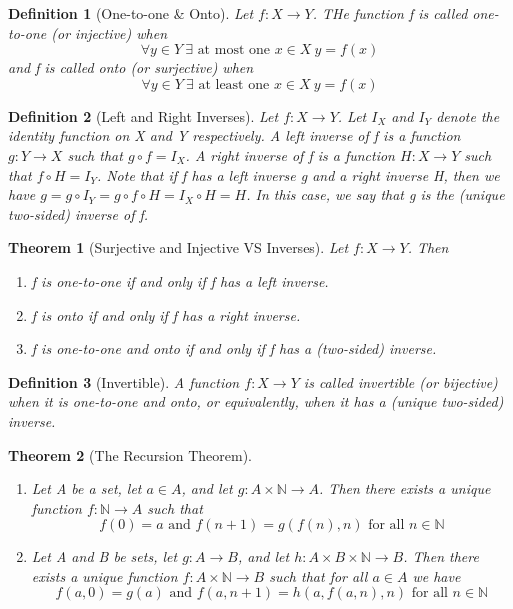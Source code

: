 \documentclass[11pt, oneside]{book}
\theoremstyle{break}
\newtheorem{thm}{Theorem}[section]
\newtheorem{defn}{Definition}[section]
\newcommand{\bb}[1]{\mathbb{#1}}			%
\begin{document}
\begin{defn}[One-to-one \& Onto]
	Let $f: X \to Y$. THe function f is called one-to-one (or injective) when
	\[
		\forall y \in Y \> \exists \text{ at most one } x \in X \> y = f(x)
	\]
	and f is called onto (or surjective) when
	\[
		\forall y \in Y \> \exists \text{ at least one } x \in X \> y = f(x)
	\]
\end{defn}

\begin{defn}[Left and Right Inverses]
	Let $f: X \to Y$. Let $I_X$ and $I_Y$ denote the identity function on X and Y respectively. A left inverse of f is a function $g: Y \to X$ such that $g \circ f = I_X$. A right inverse of f is a function $H: X \to Y$ such that $f \circ H = I_Y$. Note that if f has a left inverse g and a right inverse H, then we have $g = g \circ I_Y = g \circ f \circ H = I_X \circ H = H$. In this case, we say that g is the (unique two-sided) inverse of f.
\end{defn}

\begin{thm}[Surjective and Injective VS Inverses]
	Let $f: X \to Y$. Then
	\begin{enumerate}
		\item f is one-to-one if and only if f has a left inverse.
		\item f is onto if and only if f has a right inverse.
		\item f is one-to-one and onto if and only if f has a (two-sided) inverse.
	\end{enumerate}
\end{thm}

\begin{defn}[Invertible]
	A function $f: X \to Y$ is called invertible (or bijective) when it is one-to-one and onto, or equivalently, when it has a (unique two-sided) inverse.
\end{defn}

\begin{thm}[The Recursion Theorem]\label{recursion_theorem}
	\begin{enumerate}
		\item Let A be a set, let $a \in A$, and let $g : A \times \bb{N} \to A$. Then there exists a unique function $f: \bb{N} \to A$ such that
		\[
			f(0) = a \text{ and } f(n+1) = g(f(n), n) \text{ for all } n \in \bb{N}
		\]
		\item Let A and B be sets, let $g: A \to B$, and let $h: A \times B \times \bb{N} \to B$. Then there exists a unique function $f:A \times \bb{N} \to B$ such that for all $a \in A$ we have
		\[
			f(a, 0) = g(a) \text{ and } f(a, n + 1) = h(a, f(a, n), n) \text{ for all } n \in \bb{N}
		\]
	\end{enumerate}
\end{thm}
\end{document}
